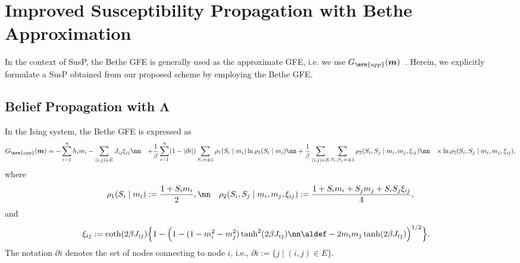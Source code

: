 \documentclass[%
 reprint,
 amsmath,amssymb,
 aps, 
 pre,
 showkeys
]{revtex4-1}
\begin{document}
\section{Improved Susceptibility Propagation with Bethe Approximation} \label{Sec:A-SusP}

In the context of SusP, the Bethe GFE is generally used as the approximate GFE, i.e. we use $G_{\mrm{app}}(\bm{m})$~\cite{Mezard&Mora2009, Marinari&Kerrebroeck2010}.
Herein, we explicitly formulate a SusP obtained from our proposed scheme by employing the Bethe GFE.

\subsection{Belief Propagation with $\bm{\Lambda}$} \label{SubSec:BP}

In the Ising system, the Bethe GFE is expressed as~\cite{Horiguchi1981, Welling&Teh2003, Yasuda&Tanaka2009}
\begin{align}
&G_{\mrm{app}}(\bm{m})=-  \sum_{i=1}^n h_i m_i -\sum_{(i,j) \in E}J_{ij} \xi_{ij} \nn
&+ \frac{1}{\beta}\sum_{i=1}^n (1- |\partial i|) \sum_{S_i = \pm 1}\rho_1(S_i\mid m_i)\ln \rho_1(S_i\mid m_i)\nn
&+ \frac{1}{\beta}\sum_{(i,j) \in E} \sum_{S_i,S_j = \pm 1} \rho_2(S_i, S_j\mid m_i, m_j, \xi_{ij})\nn
&\times \ln \rho_2(S_i, S_j\mid m_i, m_j, \xi_{ij}),
\label{eq:BetheGFE}
\end{align}
where
\begin{align*}
&\rho_1(S_i\mid m_i):= \frac{1 + S_i m_i}{2}, \nn
&\rho_2(S_i, S_j\mid m_i, m_j, \xi_{ij}):= \frac{1 + S_i m_i + S_j m_j + S_iS_j \xi_{ij}}{4},
\end{align*}
and 
\begin{align}
\xi_{ij}&:= \coth(2 \beta J_{ij})\Big\{1-\Big(1-(1-m_i^2-m_j^2) \tanh^{2}(2 \beta J_{ij}) \nn
\aldef - 2m_im_j\tanh(2 \beta J_{ij})\Big)^{1/2} \Big\}. 
\label{eq:BP-cov}
\end{align}
The notation $\partial i$ denotes the set of nodes connecting to node $i$, i.e., $\partial i:= \{ j \mid (i,j) \in E\}$. 
\end{document}
